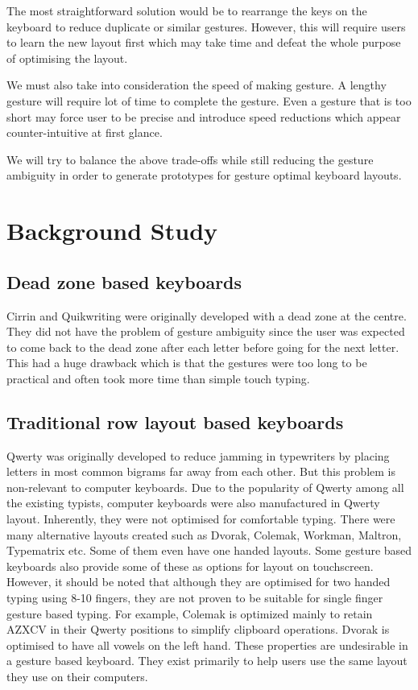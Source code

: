 \documentclass[12pt]{article}
\begin{document}
The most straightforward solution would be to rearrange the keys on the keyboard to reduce duplicate or similar gestures. However, this will require users to learn the new layout first which may take time and defeat the whole purpose of optimising the layout.


We must also take into consideration the speed of making gesture. A lengthy gesture will require lot of time to complete the gesture. Even a gesture that is too short may force user to be precise and introduce speed reductions which appear counter-intuitive at first glance.


We will try to balance the above trade-offs while still reducing the gesture ambiguity in order to generate prototypes for gesture optimal keyboard layouts.


\section{Background Study}
\subsection{Dead zone based keyboards}
Cirrin \cite{cirrin} and Quikwriting \cite{quicwriting} were originally developed with a dead zone at the centre. They did not have the problem of gesture ambiguity since the user was expected to come back to the dead zone after each letter before going for the next letter. This had a huge drawback which is that the gestures were too long to be practical and often took more time than simple touch typing.

\subsection{Traditional row layout based keyboards}
Qwerty was originally developed to reduce jamming in typewriters by placing letters in most common bigrams far away from each other. But this problem is non-relevant to computer keyboards. Due to the popularity of Qwerty among all the existing typists, computer keyboards were also manufactured in Qwerty layout. Inherently, they were not optimised for comfortable typing. There were many alternative layouts created such as Dvorak, Colemak, Workman, Maltron, Typematrix etc. Some of them even have one handed layouts. Some gesture based keyboards also provide some of these as options for layout on touchscreen. However, it should be noted that although they are optimised for two handed typing using 8-10 fingers, they are not proven to be suitable for single finger gesture based typing. For example, Colemak is optimized mainly to retain AZXCV in their Qwerty positions to simplify clipboard operations. Dvorak is optimised to have all vowels on the left hand. These properties are undesirable in a gesture based keyboard. They exist primarily to help users use the same layout they use on their computers.
\end{document}

